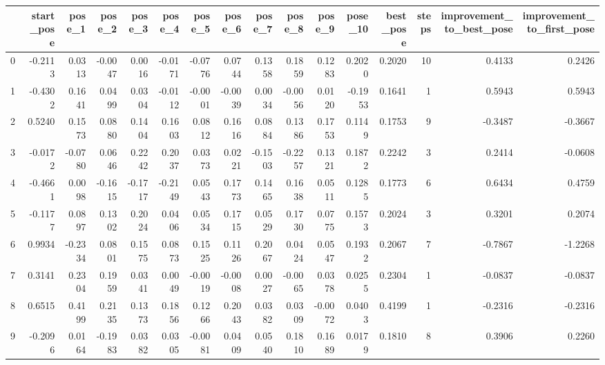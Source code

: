 \begin{tabular}{lrrrrrrrrrrrrrrr}
\toprule
{} &  start\_pose &  pose\_1 &  pose\_2 &  pose\_3 &  pose\_4 &  pose\_5 &  pose\_6 &  pose\_7 &  pose\_8 &  pose\_9 &  pose\_10 &  best\_pose &  steps &  improvement\_to\_best\_pose &  improvement\_to\_first\_pose \\
\midrule
0   &     -0.2113 &  0.0313 & -0.0047 &  0.0016 & -0.0171 & -0.0776 &  0.0744 &  0.1358 &  0.1859 &  0.1283 &   0.2020 &     0.2020 &     10 &                    0.4133 &                     0.2426 \\
1   &     -0.4302 &  0.1641 &  0.0499 &  0.0304 & -0.0112 & -0.0001 & -0.0039 &  0.0034 & -0.0056 &  0.0120 &  -0.1953 &     0.1641 &      1 &                    0.5943 &                     0.5943 \\
2   &      0.5240 &  0.1573 &  0.0880 &  0.1404 &  0.1603 &  0.0812 &  0.1616 &  0.0884 &  0.1386 &  0.1753 &   0.1149 &     0.1753 &      9 &                   -0.3487 &                    -0.3667 \\
3   &     -0.0172 & -0.0780 &  0.0646 &  0.2242 &  0.2037 &  0.0373 &  0.0221 & -0.1503 & -0.2257 &  0.1321 &   0.1872 &     0.2242 &      3 &                    0.2414 &                    -0.0608 \\
4   &     -0.4661 &  0.0098 & -0.1615 & -0.1717 & -0.2149 &  0.0543 &  0.1773 &  0.1465 &  0.1638 &  0.0511 &   0.1285 &     0.1773 &      6 &                    0.6434 &                     0.4759 \\
5   &     -0.1177 &  0.0897 &  0.1302 &  0.2024 &  0.0406 &  0.0534 &  0.1715 &  0.0529 &  0.1730 &  0.0775 &   0.1573 &     0.2024 &      3 &                    0.3201 &                     0.2074 \\
6   &      0.9934 & -0.2334 &  0.0801 &  0.1575 &  0.0873 &  0.1525 &  0.1126 &  0.2067 &  0.0424 &  0.0547 &   0.1932 &     0.2067 &      7 &                   -0.7867 &                    -1.2268 \\
7   &      0.3141 &  0.2304 &  0.1959 &  0.0341 &  0.0049 & -0.0019 & -0.0008 &  0.0027 & -0.0065 &  0.0378 &   0.0255 &     0.2304 &      1 &                   -0.0837 &                    -0.0837 \\
8   &      0.6515 &  0.4199 &  0.2135 &  0.1373 &  0.1856 &  0.1266 &  0.2043 &  0.0382 &  0.0309 & -0.0072 &   0.0403 &     0.4199 &      1 &                   -0.2316 &                    -0.2316 \\
9   &     -0.2096 &  0.0164 & -0.1983 &  0.0382 &  0.0305 & -0.0081 &  0.0409 &  0.0540 &  0.1810 &  0.1689 &   0.0179 &     0.1810 &      8 &                    0.3906 &                     0.2260 \\

\end{tabular}
